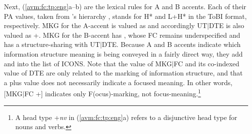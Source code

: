 



Next, (\ref{avm:fc:tp:eng}a--b) are the lexical rules for A and B
accents. Each of their PA values, taken from
\citeauthor{bildhauer:07}'s hierarchy
, stands for H* and L+H* in the ToBI
format, respectively. MKG for the A-accent
is valued as  and accordingly UT{$\mid$}DTE is also
valued as +. MKG for the B-accent has , whose FC remains
underspecified and has a structure-sharing with
UT{$\mid$}DTE. Because A and B accents indicate
which information structure meaning is being conveyed in a fairly
direct way, they add  and 
into the list of ICONS. Note that the value of MKG{$\mid$}FC and its
co-indexed value of DTE are only related to the marking of information
structure, and that a plus value does not necessarily indicate a
focused meaning. In other words, [MKG{$\mid$}FC +] indicates only
F(ocus)-marking, not focus-meaning.\footnote{A head type +\textit{nv}
  in (\ref{avm:fc:tp:eng}a) refers to a disjunctive head type for nouns
  and verbs.}
 


